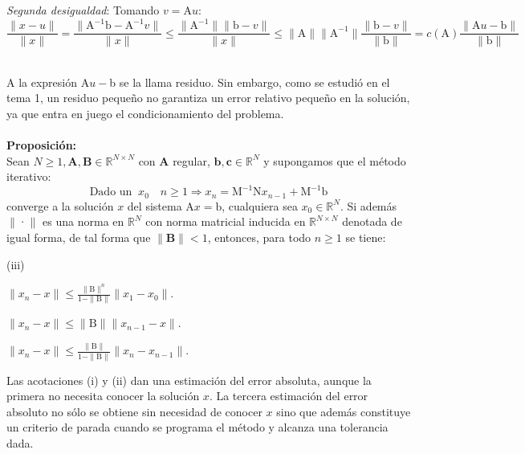 \documentclass{article}
\begin{document}
\emph{Segunda desigualdad}: Tomando $v=\text{A}u$:
$$\frac{\|x-u\|}{\|x\|}=\frac{\|\text{A}^{-1}\text{b}-\text{A}^{-1}v\|}{\|x\|}\leq\frac{\|\text{A}^{-1}\|\|\text{b}-v\|}{\|x\|}\leq\|\text{A}\|\|\text{A}^{-1}\|\frac{\|\text{b}-v\|}{\|\text{b}\|}=c(\text{A})\frac{\|\text{A}u-\text{b}\|}{\|\text{b}\|}$$

\hrulefill
\\
A la expresión A$u-$b se la llama residuo. Sin embargo, como se estudió en el tema 1, un residuo pequeño no garantiza un error relativo pequeño en la solución, ya que entra en juego el condicionamiento del problema.
\\
\\
\textbf{Proposición:}
\\
Sean $N\geq 1,\textbf{A},\textbf{B}\in\mathbb{R}^{N\times N}$ con \textbf{A} regular, $\textbf{b},\textbf{c}\in\mathbb{R}^N$ y supongamos que el método iterativo: 
$$\text{Dado un }\:x_0\quad n\geq 1\Rightarrow x_n=\text{M}^{-1}\text{N}x_{n-1}+\text{M}^{-1}\text{b}$$
converge a la solución $x$ del sistema $\text{A}x=\text{b}$, cualquiera sea $x_0\in\mathbb{R}^N$. Si además $\|$·$\|$ es una norma en $\mathbb{R}^N$ con norma matricial inducida en $\mathbb{R}^{N\times N}$ denotada de igual forma, de tal forma que $\|\textbf{B}\|<1$, entonces, para todo $n\geq 1$ se tiene:
\begin{labeling}{(iii)}
\item [(i)] $\|x_n-x\|\leq\displaystyle\frac{\|\text{B}\|^n}{1-\|\text{B}\|}\|x_1-x_0\|$.
\item [(ii)] $\|x_n-x\|\leq\|\text{B}\|\|x_{n-1}-x\|$.
\item [(iii)] $\|x_n-x\|\leq\displaystyle\frac{\|\text{B}\|}{1-\|\text{B}\|}\|x_n-x_{n-1}\|$.	
\end{labeling}
Las acotaciones (i) y (ii) dan una estimación del error absoluta, aunque la primera no necesita conocer la solución $x$. La tercera estimación del error absoluto no sólo se obtiene sin necesidad de conocer $x$ sino que además constituye un criterio de parada cuando se programa el método y alcanza una tolerancia dada.
\end{document}
